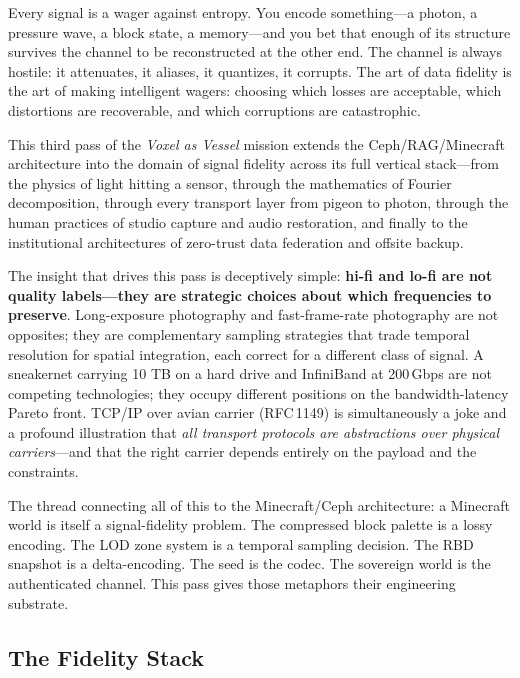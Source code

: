 \documentclass[11pt,letterpaper]{article}
\begin{document}
Every signal is a wager against entropy. You encode something---a photon, a pressure wave, a block state, a memory---and you bet that enough of its structure survives the channel to be reconstructed at the other end. The channel is always hostile: it attenuates, it aliases, it quantizes, it corrupts. The art of data fidelity is the art of making intelligent wagers: choosing which losses are acceptable, which distortions are recoverable, and which corruptions are catastrophic.

This third pass of the \emph{Voxel as Vessel} mission extends the Ceph/RAG/Minecraft architecture into the domain of signal fidelity across its full vertical stack---from the physics of light hitting a sensor, through the mathematics of Fourier decomposition, through every transport layer from pigeon to photon, through the human practices of studio capture and audio restoration, and finally to the institutional architectures of zero-trust data federation and offsite backup.

The insight that drives this pass is deceptively simple: \textbf{hi-fi and lo-fi are not quality labels---they are strategic choices about which frequencies to preserve}. Long-exposure photography and fast-frame-rate photography are not opposites; they are complementary sampling strategies that trade temporal resolution for spatial integration, each correct for a different class of signal. A sneakernet carrying 10 TB on a hard drive and InfiniBand at 200\,Gbps are not competing technologies; they occupy different positions on the bandwidth-latency Pareto front. TCP/IP over avian carrier (RFC\,1149) is simultaneously a joke and a profound illustration that \emph{all transport protocols are abstractions over physical carriers}---and that the right carrier depends entirely on the payload and the constraints.

The thread connecting all of this to the Minecraft/Ceph architecture: a Minecraft world is itself a signal-fidelity problem. The compressed block palette is a lossy encoding. The LOD zone system is a temporal sampling decision. The RBD snapshot is a delta-encoding. The seed is the codec. The sovereign world is the authenticated channel. This pass gives those metaphors their engineering substrate.

\subsection{The Fidelity Stack}
\end{document}
